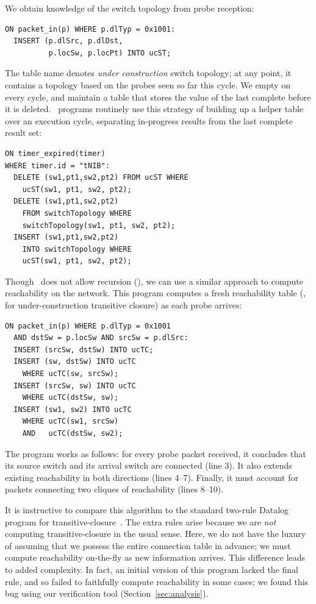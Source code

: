 We obtain knowledge of the switch topology from probe reception:
\begin{lstlisting}[label=list:9]   
ON packet_in(p) WHERE p.dlTyp = 0x1001:
  INSERT (p.dlSrc, p.dlDst,
          p.locSw, p.locPt) INTO ucST;
\end{lstlisting}
The table name  denotes \emph{under
construction} switch topology; at any point, it contains a topology based on the
probes seen so far this cycle. We empty  on every
cycle, and maintain a  table that stores the value
of the last complete  before it is deleted. \flowlog\ programs routinely use
this strategy of building up a helper table over an execution cycle,
separating in-progress results from the last complete result set:
\begin{lstlisting}[label=list:10]
ON timer_expired(timer) 
WHERE timer.id = "tNIB":
  DELETE (sw1,pt1,sw2,pt2) FROM ucST WHERE    
    ucST(sw1, pt1, sw2, pt2); 
  DELETE (sw1,pt1,sw2,pt2) 
    FROM switchTopology WHERE     
    switchTopology(sw1, pt1, sw2, pt2); 
  INSERT (sw1,pt1,sw2,pt2) 
    INTO switchTopology WHERE     
    ucST(sw1, pt1, sw2, pt2);  
\end{lstlisting}
Though \flowlog\ does not allow recursion (), 
we can use a similar approach to compute reachability on the network. This
program computes a fresh reachability table (, for
under-construction transitive closure) as each probe arrives:
\begin{lstlisting}[label=list:11]   
ON packet_in(p) WHERE p.dlTyp = 0x1001
  AND dstSw = p.locSw AND srcSw = p.dlSrc:
  INSERT (srcSw, dstSw) INTO ucTC;
  INSERT (sw, dstSw) INTO ucTC 
    WHERE ucTC(sw, srcSw);
  INSERT (srcSw, sw) INTO ucTC 
    WHERE ucTC(dstSw, sw);
  INSERT (sw1, sw2) INTO ucTC 
    WHERE ucTC(sw1, srcSw) 
    AND   ucTC(dstSw, sw2);
\end{lstlisting}
The program works as follows: for every probe packet
received, it concludes that its source switch and its arrival switch
are connected (line 3). It also extends
existing reachability in both directions (lines 4--7). Finally,
it must account for packets connecting two cliques of reachability (lines
8--10).

It is instructive to compare this algorithm to the standard two-rule Datalog
program for transitive-closure~\cite[p. 274]{abiteboul.hull.ea:foundations}. The extra rules arise because we are \emph{not}
computing transitive-closure in the usual sense. Here, we do not have the luxury of
assuming that we possess the entire connection table in advance; we must
compute reachability on-the-fly as new information arrives. This difference
leads to added complexity. In fact, an initial version of this program lacked
the final rule, and so failed to faithfully compute reachability in some
cases; we found this bug using our verification tool (Section~\ref{sec:analysis}).

